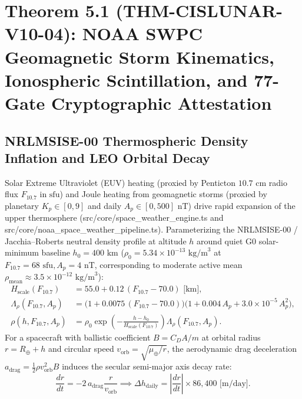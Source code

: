 \documentclass[11pt,a4paper,reqno]{article}
\def\texttt#1{#1}%
\theoremstyle{plain}
\theoremstyle{definition}
\theoremstyle{remark}
\numberwithin{equation}{section}
\begin{document}
\section{\texorpdfstring{Theorem 5.1 (\texttt{THM-CISLUNAR-V10-04}): NOAA SWPC Geomagnetic Storm Kinematics, Ionospheric Scintillation, and 77-Gate Cryptographic Attestation}{Theorem 5.1 (THM-CISLUNAR-V10-04): NOAA SWPC Geomagnetic Storm Kinematics, Ionospheric Scintillation, and 77-Gate Cryptographic Attestation}}

\subsection{NRLMSISE-00 Thermospheric Density Inflation and LEO Orbital Decay}
Solar Extreme Ultraviolet (EUV) heating (proxied by Penticton $10.7\text{ cm}$ radio flux $F_{10.7}$ in $\text{sfu}$) and Joule heating from geomagnetic storms (proxied by planetary $K_p \in [0, 9]$ and daily $A_p \in [0, 500]\text{ nT}$) drive rapid expansion of the upper thermosphere (\texttt{src/core/space\_weather\_engine.ts} and \texttt{src/core/noaa\_space\_weather\_pipeline.ts}). Parameterizing the NRLMSISE-00 / Jacchia--Roberts neutral density profile at altitude $h$ around quiet G0 solar-minimum baseline $h_0 = 400\text{ km}$ ($\rho_0 = 5.34 \times 10^{-13}\text{ kg/m}^3$ at $F_{10.7} = 68\text{ sfu}, A_p = 4\text{ nT}$, corresponding to moderate active mean $\rho_{\text{mean}} \approx 3.5 \times 10^{-12}\text{ kg/m}^3$):
\begin{align}
  H_{\text{scale}}(F_{10.7}) &= 55.0 + 0.12\,(F_{10.7} - 70.0)\text{ [km]}, \label{eq:scale_height} \\
  \Lambda_{\rho}(F_{10.7}, A_p) &= \big(1 + 0.0075\,(F_{10.7} - 70.0)\big)\big(1 + 0.004\,A_p + 3.0 \times 10^{-5}\,A_p^2\big), \label{eq:density_inflation} \\
  \rho(h, F_{10.7}, A_p) &= \rho_0 \exp\!\left(-\frac{h - h_0}{H_{\text{scale}}(F_{10.7})}\right) \Lambda_{\rho}(F_{10.7}, A_p). \label{eq:nrlmsise_rho}
\end{align}
For a spacecraft with ballistic coefficient $B = C_D A / m$ at orbital radius $r = R_\oplus + h$ and circular speed $v_{\text{orb}} = \sqrt{\mu_\oplus / r}$, the aerodynamic drag deceleration $a_{\text{drag}} = \frac{1}{2}\rho v_{\text{orb}}^2 B$ induces the secular semi-major axis decay rate:
\begin{equation}
  \frac{dr}{dt} = -2\,a_{\text{drag}}\frac{r}{v_{\text{orb}}} \implies \Delta h_{\text{daily}} = \left|\frac{dr}{dt}\right| \times 86,400\text{ [m/day]}.
  \label{eq:daily_decay}
\end{equation}
\end{document}
